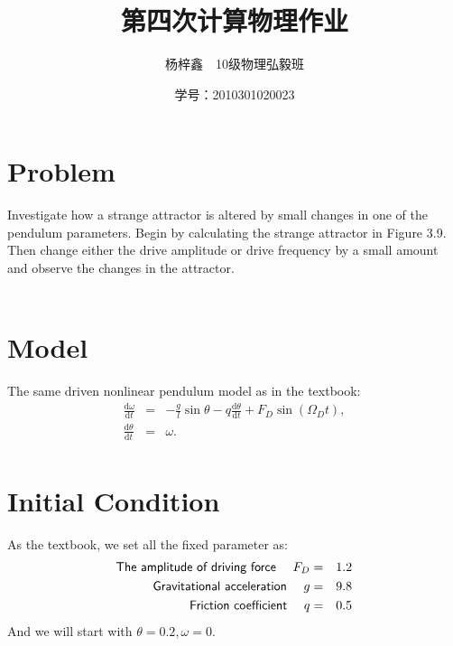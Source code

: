 \documentclass{article}
\author{杨梓鑫\ \ 10级物理弘毅班}
\title{第四次计算物理作业}
\date{学号：2010301020023}
\newcommand{\ud}{\mathrm{d}}
\begin{document}
	\maketitle
\section{Problem}
	\noindent {} Investigate how a strange attractor is altered by small changes in one of the pendulum parameters. Begin by calculating the strange attractor in Figure 3.9. Then change either the drive amplitude or drive frequency by a small amount and observe the changes in the attractor.\\\\


\section{Model}
\noindent \sf The same driven nonlinear pendulum model as in the textbook:
	\begin{eqnarray*}
		\frac{\ud \omega}{\ud t} &=& -\frac{g}{l}\sin\theta - q\frac{\ud \theta}{\ud t} + F_D \sin(\Omega_Dt),\\
		\frac{\ud \theta}{\ud t} &=& \omega.\\
	\end{eqnarray*}


\section{Initial Condition}
	\noindent \sf As the textbook, we set all the fixed parameter as:
	\begin{eqnarray*}
\textsf{The amplitude of driving force \quad  } F_D&=&1.2\\
\textsf{Gravitational acceleration  \quad } g&=&9.8\\
\textsf{Friction coefficient  \quad  }q&=&0.5\\
	\end{eqnarray*}
And we will start with $\theta=0.2,\omega=0$.\\\\

\newpage
\end{document}
